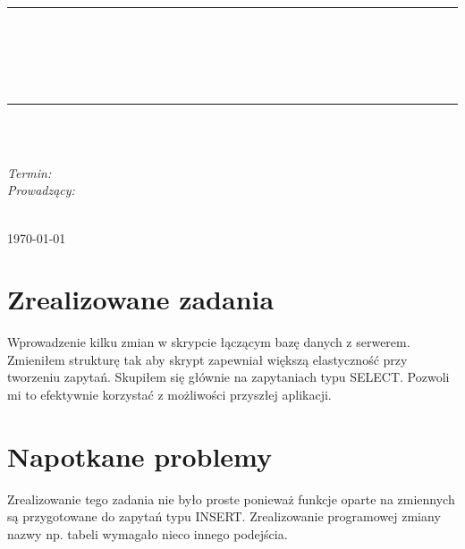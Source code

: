 \documentclass[10pt, a4paper]{article}
\begin{document}
\def\tablename{Tabela}	%

\begin{titlepage}
	\begin{center}
		\textsc{\LARGE \formakursu}\\[1cm]		
		\textsc{\Large \kurs}\\[0.5cm]		
		\rule{\textwidth}{0.08cm}\\[0.4cm]
		{\huge \bfseries \doctype}\\[1cm]
		{\huge \bfseries \projectname}\\[0.5cm]
		{\huge \bfseries \acronim}\\[0.4cm]
		\rule{\textwidth}{0.08cm}\\[1cm]
		
		\begin{flushright} \large
		\osobaA\\[0.4cm]

		
		\emph{Termin: }\termin\\[0.4cm]

		\emph{Prowadzący:} \\
		\prowadzacy \\
		
		\end{flushright}
		
		\vfill
		
		{\large \today}
	\end{center}	
\end{titlepage}


\section{Zrealizowane zadania}
\label{sec:OpisProjektu}

Wprowadzenie kilku zmian w skrypcie łączącym bazę danych z serwerem. Zmieniłem strukturę tak aby skrypt zapewniał większą elastyczność przy tworzeniu zapytań. Skupiłem się głównie na zapytaniach typu SELECT. Pozwoli mi to efektywnie korzystać z możliwości przyszłej aplikacji.

\section{Napotkane problemy}
Zrealizowanie tego zadania nie było proste ponieważ funkcje oparte na zmiennych są przygotowane do zapytań typu INSERT. Zrealizowanie programowej zmiany nazwy np. tabeli  wymagało nieco innego podejścia.
\end{document}
